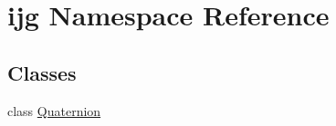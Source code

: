 \hypertarget{namespaceijg}{\section{ijg Namespace Reference}
\label{namespaceijg}
}
\subsection*{Classes}
\begin{DoxyCompactItemize}
\item 
class \hyperlink{classijg_1_1_quaternion}{Quaternion}
\end{DoxyCompactItemize}
